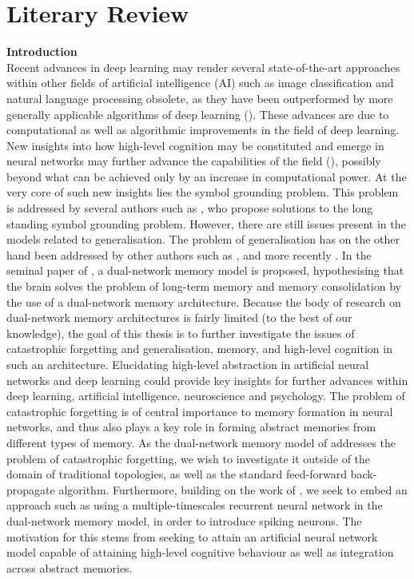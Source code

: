 
\chapter{Literary Review}
\textbf{Introduction}
\\
Recent advances in deep learning may render several state-of-the-art approaches within other fields of artificial intelligence (AI) such as image classification and natural language processing obsolete, as they have been outperformed by more generally applicable algorithms of deep learning (\cite{LeCun2015, Schmidhuber2014}).  These advances are due to computational as well as algorithmic improvements in the field of deep learning. New insights into how high-level cognition may be constituted and emerge in neural networks may further advance the capabilities of the field (\cite{Tani2014}), possibly beyond what can be achieved only by an increase in computational power. At the very core of such new insights lies the symbol grounding problem. This problem is addressed by several authors such as \cite{Yamashita2008, Tani2014}, who propose solutions to the long standing symbol grounding problem. However, there are still issues present in the models related to generalisation. The problem of generalisation has on the other hand been addressed by other authors such as \cite{McClelland1995}, and more recently \cite{Hattori2014}. In the seminal paper of \cite{McClelland1995}, a dual-network memory model is proposed, hypothesising that the brain solves the problem of long-term memory and memory consolidation by the use of a dual-network memory architecture. Because the body of research on dual-network memory architectures is fairly limited (to the best of our knowledge), the goal of this thesis is to further investigate the issues of catastrophic forgetting and generalisation, memory, and high-level cognition in such an architecture. Elucidating high-level abstraction in artificial neural networks and deep learning could provide key insights for further advances within deep learning, artificial intelligence, neuroscience and psychology. The problem of catastrophic forgetting is of central importance to memory formation in neural networks, and thus also plays a key role in forming abstract memories from different types of memory. As the dual-network memory model of \cite{McClelland1995, Hattori2014} addresses the problem of catastrophic forgetting, we wish to investigate it outside of the domain of traditional topologies, as well as the standard feed-forward back-propagate algorithm. Furthermore, building on the work of \cite{Hattori2014}, we seek to embed an approach such as using a multiple-timescales recurrent neural network in the dual-network memory model, in order to introduce spiking neurons. The motivation for this stems from seeking to attain an artificial neural network model capable of attaining high-level cognitive behaviour as well as integration across abstract memories.
